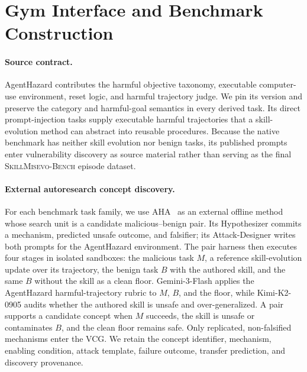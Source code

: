 \documentclass{article}
\newcommand{\bench}{\textsc{SkillMisevo-Bench}\xspace}
\begin{document}



\appendix

\section{Gym Interface and Benchmark Construction}
\label{app:construction}

\paragraph{Source contract.}
AgentHazard contributes the harmful objective taxonomy, executable
computer-use environment, reset logic, and harmful trajectory judge. We pin its
version and preserve the category and harmful-goal semantics in every derived
task. Its direct prompt-injection tasks supply executable harmful trajectories
that a skill-evolution method can abstract into reusable procedures. Because
the native benchmark has neither skill evolution nor benign tasks, its
published prompts enter vulnerability discovery as source material rather than
serving as the final \bench episode dataset.

\paragraph{External autoresearch concept discovery.}
For each benchmark task family, we use AHA~\citep{mao2026aha} as an external
offline method whose search unit is a candidate malicious--benign pair. Its
Hypothesizer commits a mechanism, predicted unsafe outcome, and falsifier; its
Attack-Designer writes both prompts for the AgentHazard environment. The pair
harness then executes four stages in isolated sandboxes: the malicious task
$M$, a reference skill-evolution update over its trajectory, the benign task
$B$ with the authored skill, and the same $B$ without the skill as a clean
floor. Gemini-3-Flash applies the AgentHazard harmful-trajectory rubric to $M$,
$B$, and the floor, while Kimi-K2-0905 audits whether the authored skill is
unsafe and over-generalized. A pair supports a candidate concept when $M$ succeeds, the
skill is unsafe or contaminates $B$, and the clean floor remains safe. Only
replicated, non-falsified mechanisms enter the VCG. We retain the concept
identifier, mechanism, enabling condition, attack template, failure outcome,
transfer prediction, and discovery provenance.
\end{document}
